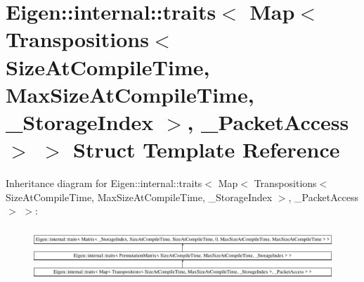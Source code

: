 \hypertarget{struct_eigen_1_1internal_1_1traits_3_01_map_3_01_transpositions_3_01_size_at_compile_time_00_01_1a60846531a8bf67fbbfd4180820bbd1}{}\section{Eigen\+::internal\+::traits$<$ Map$<$ Transpositions$<$ Size\+At\+Compile\+Time, Max\+Size\+At\+Compile\+Time, \+\_\+\+Storage\+Index $>$, \+\_\+\+Packet\+Access $>$ $>$ Struct Template Reference}
\label{struct_eigen_1_1internal_1_1traits_3_01_map_3_01_transpositions_3_01_size_at_compile_time_00_01_1a60846531a8bf67fbbfd4180820bbd1}
Inheritance diagram for Eigen\+::internal\+::traits$<$ Map$<$ Transpositions$<$ Size\+At\+Compile\+Time, Max\+Size\+At\+Compile\+Time, \+\_\+\+Storage\+Index $>$, \+\_\+\+Packet\+Access $>$ $>$\+:\begin{figure}[H]
\begin{center}
\leavevmode
\includegraphics[height=2.036364cm]{struct_eigen_1_1internal_1_1traits_3_01_map_3_01_transpositions_3_01_size_at_compile_time_00_01_1a60846531a8bf67fbbfd4180820bbd1}
\end{center}
\end{figure}
